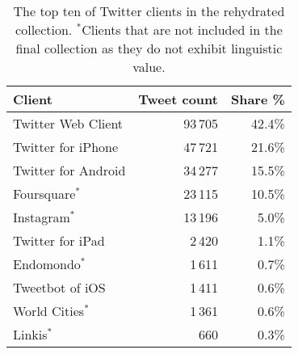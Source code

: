 \begin{table}[th]
  \small
  \centering
  \begin{tabular}{lrr}
    \toprule
    Client & Tweet count & Share \% \\
    \midrule
    Twitter Web Client     & 93\,705 &    42.4\% \\
    Twitter for iPhone     & 47\,721 &    21.6\% \\
    Twitter for Android    & 34\,277 &    15.5\% \\
    Foursquare$^*$             & 23\,115 &    10.5\% \\
    Instagram$^*$               & 13\,196 &     5.0\% \\
    Twitter for iPad       & 2\,420  &     1.1\% \\
    Endomondo$^*$               & 1\,611  &     0.7\% \\
    Tweetbot of iOS        & 1\,411  &     0.6\% \\
    World Cities$^*$            & 1\,361  &     0.6\% \\
    Linkis$^*$                  &  660  &     0.3\% \\
    \bottomrule
  \end{tabular}
  \caption{The top ten of Twitter clients in the rehydrated collection. $^*$Clients
    that are not included in the final collection as they do not exhibit
    linguistic value.}
  \label{tab:client-counts}
\end{table}